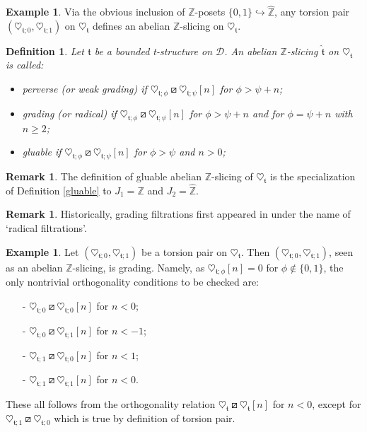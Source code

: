 \documentclass{article}
\newtheorem{defn}[thm]{Definition}
\theoremstyle{definition}
\newtheorem{exmp}[thm]{Example}
\newtheorem{rem}[thm]{Remark}
\newcommand{\Z}{\mathbb{Z}}
\newcommand{\tee}{\mathfrak{t}}
\newcommand{\orth}{\boxslash}
\begin{document}
\begin{exmp}
Via the obvious inclusion of $\Z$-posets $\{0,1\}\hookrightarrow\hat{\Z}$, any torsion pair $(\heartsuit_{\tee;0},\heartsuit_{\tee;1})$ on $\heartsuit_{\mathfrak{t}}$ defines an abelian $\Z$-slicing on $\heartsuit_{\mathfrak{t}}$.
\end{exmp}
\begin{defn}\label{defgrad}
Let $\mathfrak{t}$ be a bounded t-structure on $\mathscr{D}$. An abelian $\mathbb{Z}$-slicing $\hat{\tee}$ on $\heartsuit_{\mathfrak{t}}$ is called:
\begin{itemize}
\item \emph{perverse} (or \emph{weak grading})
 if $\heartsuit_{\tee;\phi}\orth\heartsuit_{\tee;\psi}[n]$ for $\phi>\psi+n$; 
\item \emph{grading %
} (or \emph{radical}) if $\heartsuit_{\tee;\phi}\orth\heartsuit_{\tee;\psi}[n]$ for $\phi>\psi+n$ and %
 for $\phi=\psi+n$ with $n\geq 2$; 
\item \emph{gluable} if $\heartsuit_{\tee;\phi}\orth \heartsuit_{\tee;\psi}[n]$ %
for $\phi>\psi$ and $n>0$;
\end{itemize} 
\end{defn}
\begin{rem}\label{special-gluable}
The definition of gluable abelian $\Z$-slicing of $\heartsuit_\tee$ is the specialization of Definition \ref{gluable} to $J_1=\Z$ and $J_2=\hat{\Z}$.
\end{rem}
\begin{rem}
Historically, grading filtrations first appeared in \cite{ekh} under the name of `radical filtrations'.%
\end{rem}
\begin{exmp}
Let  $(\heartsuit_{\tee;0},\heartsuit_{\tee;1})$ be a torsion pair on $\heartsuit_{\mathfrak{t}}$. Then $(\heartsuit_{\tee;0},\heartsuit_{\tee;1})$, seen as an abelian $\Z$-slicing, is grading. Namely, as $\heartsuit_{\tee;\phi}[n]=0$ for $\phi \notin\{ 0,1\}$, the only nontrivial orthogonality conditions to be checked are:
\begin{itemize}
\item[-] $\heartsuit_{\tee;0}\orth\heartsuit_{\tee;0}[n]$ for $n<0$;
\item[-] $\heartsuit_{\tee;0}\orth\heartsuit_{\tee;1}[n]$ for $n<-1$;
\item[-] $\heartsuit_{\tee;1}\orth\heartsuit_{\tee;0}[n]$ for $n<1$;
\item[-] $\heartsuit_{\tee;1}\orth\heartsuit_{\tee;1}[n]$ for $n<0$.
\end{itemize}
These all follows from the orthogonality relation $\heartsuit_{\tee}\orth \heartsuit_\tee[n]$ for $n< 0$, except for $\heartsuit_{\tee;1}\orth\heartsuit_{\tee;0}$ which is true by definition of torsion pair.
\end{exmp}
\end{document}
